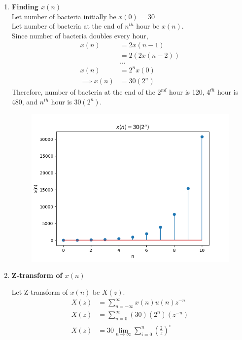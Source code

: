 \documentclass[journal,12pt,twocolumn]{IEEEtran}
\theoremstyle{remark}
\begin{document}
\begin{enumerate}
\item \textbf{Finding $x(n)$}
\\
Let number of bacteria initially be $x(0)$ = 30
\\
Let number of bacteria at the end of $n^{th}$ hour be $x(n)$.
\\
Since number of bacteria doubles every hour,
\begin{align}
x(n) &= 2x(n - 1) \\
&= 2(2x(n - 2)) \\
&\nonumber{\dots} \\
x(n) &= 2^nx(0) \\
\implies x(n) &= 30(2^n)
\end{align}
Therefore, number of bacteria at the end of the $2^{nd}$ hour is 120, $4^{th}$ hour is 480, and $n^{th}$ hour is $30(2^n)$.

\begin{figure}[h!]
    \centering
    \includegraphics[width=\columnwidth]{figs/11_9_3_30.png}
\end{figure}


\item \textbf{Z-transform of $x(n)$}

Let Z-transform of $x(n)$ be $X(z)$.
\begin{align}
X(z) &= \sum_{n = -\infty}^{\infty} x(n)u(n)z^{-n} \\
X(z) &= \sum_{n = 0}^{\infty} (30)(2^n)(z^{-n}) \\
X(z) &= 30\lim_{n\to\infty}\sum_{i = 0}^{n}(\frac{2}{z})^i
\end{align}


\end{enumerate}
\end{document}
